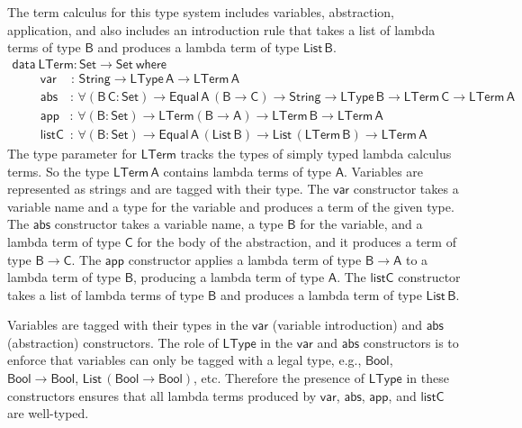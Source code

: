 \documentclass[9pt]{entcs} \usepackage{entcsmacro}
\begin{document}
\begin{example}
The term calculus for this type system includes variables, abstraction, application, 
and also includes an introduction rule that takes a list of lambda terms of type $\mathsf{B}$ and produces a lambda term of type $\mathsf{List\,B}$.
\begin{equation}\label{eq:eq_lterm}
\begin{array}{l}
\mathsf{data\ LTerm : Set \to Set\ where}\\
\mathsf{\;\;\;\;\;\;\;\;var\,\,\,\,\,\,\,:\, String \to LType\,A \to LTerm\,A} \\
\mathsf{\;\;\;\;\;\;\;\;abs\,\,\,\,\,\, :\, \forall (B\,C : Set) \to Equal\,A\,(B \to C) \to String 
      \to LType\,B \to LTerm\,C \to LTerm\,A}\\
  \mathsf{\;\;\;\;\;\;\;\;app\,\,\,\,\, :\, \forall (B : Set) \to LTerm (B \to A) \to LTerm\,B \to LTerm\,A} \\
  \mathsf{\;\;\;\;\;\;\;\;listC\,\,\, :\, \forall (B : Set) \to Equal\,A\,(List\,B) \to List\,(LTerm\,B) \to LTerm\,A}
\end{array}
\end{equation}
The type parameter for $\mathsf{LTerm}$ tracks the types of simply typed lambda calculus terms.
So the type $\mathsf{LTerm\,A}$ contains lambda terms of type $\mathsf{A}$. 
Variables are represented as strings and are tagged with their type.
The $\mathsf{var}$ constructor takes a variable name and a type for the variable and produces
a term of the given type.
The $\mathsf{abs}$ constructor takes a variable name, a type $\mathsf{B}$ for the variable,
and a lambda term of type $\mathsf{C}$ for the body of the abstraction,
and it produces a term of type $\mathsf{B \to C}$.
The $\mathsf{app}$ constructor applies a lambda term of type $\mathsf{B \to A}$ to a lambda term of type $\mathsf{B}$,
producing a lambda term of type $\mathsf{A}$. 
The $\mathsf{listC}$ constructor takes a list of lambda terms of type $\mathsf{B}$ and produces a lambda term of type $\mathsf{List\,B}$.

Variables are tagged with their types in the $\mathsf{var}$ (variable introduction) and 
$\mathsf{abs}$ (abstraction) constructors.
The role of $\mathsf{LType}$ in the $\mathsf{var}$ and $\mathsf{abs}$ constructors
is to enforce that variables can only be tagged with a legal type, e.g., $\mathsf{Bool}$, 
$\mathsf{Bool \to Bool}$, $\mathsf{List\, (Bool \to Bool)}$, etc. 
Therefore the presence of $\mathsf{LType}$ in these constructors ensures that all lambda terms produced by 
$\mathsf{var}$, $\mathsf{abs}$, $\mathsf{app}$, and $\mathsf{listC}$ are well-typed. 
\end{example}
\end{document}
